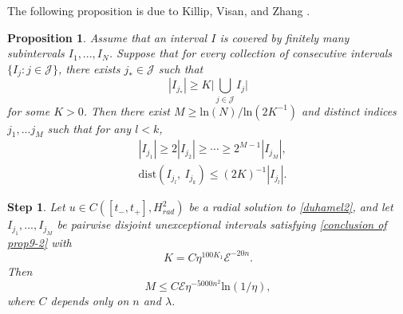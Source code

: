 \documentclass[11pt,a4paper]{article}
\numberwithin{equation}{section}
\newtheorem{proposition}[theorem]{Proposition}
\newtheorem{step}{Step}[section]
\begin{document}
The following proposition is due to Killip, Visan, and Zhang \cite{Killip}.

\begin{proposition}\label{prop9-2}
Assume that an interval $I$ is covered by finitely many subintervals $I_{1},...,I_{N}$.
Suppose that for every collection of consecutive intervals $\{ I_{j} : j \in \mathcal{J}\}$, there exists $j_{*} \in \mathcal{J}$ such that
\[
 |I_{j_{*}}| \geq K\big|\bigcup_{j \in \mathcal{J}} I_{j}\big|
\]
for some $K > 0$.
Then there exist $M \geq \text{ln}(N) / \text{ln}(2K^{-1})$ and distinct indices $j_{1},...j_{M}$ such that for any $l < k$,
\begin{equation}\label{conclusion of prop9-2}
\begin{aligned}
&|I_{j_{1}}| \geq 2|I_{j_{2}}| \geq \cdots \geq 2^{M-1}|I_{j_{M}}|,\\
&\text{dist}(I_{j_{l}},\  I_{j_{k}})  \leq (2K)^{-1}|I_{j_{l}}|.
\end{aligned}
\end{equation}
\end{proposition}

\begin{step}\label{step5}
Let $u \in C([t_{-}, t_{+}], H^{2}_{rad})$ be a radial solution to \eqref{duhamel2}, and let $I_{j_{1}},...,I_{j_{M}}$ be pairwise disjoint unexceptional intervals satisfying \eqref{conclusion of prop9-2} with
\[
K = C\eta^{100K_{1}}\mathcal{E}^{-20n}.
\]
Then
\[
M \leq C\mathcal{E}\eta^{-5000n^{2}}\text{ln}(1/\eta),
\]
where $C$ depends only on $n$ and $\lambda$.
\end{step}
\end{document}
